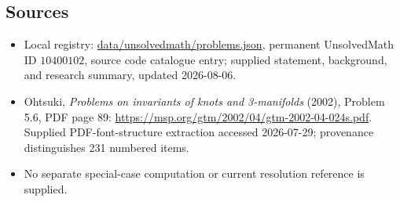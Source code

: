 \documentclass[11pt]{article}
\begin{document}
\subsection{Sources}
\begin{itemize}
\item Local registry: \url{data/unsolvedmath/problems.json}, permanent UnsolvedMath ID \(10400102\), source code catalogue entry; supplied statement, background, and research summary, updated 2026-08-06.
\item Ohtsuki, \emph{Problems on invariants of knots and 3-manifolds} (2002), Problem 5.6, PDF page 89: \url{https://msp.org/gtm/2002/04/gtm-2002-04-024s.pdf}. Supplied PDF-font-structure extraction accessed 2026-07-29; provenance distinguishes 231 numbered items.
\item No separate special-case computation or current resolution reference is supplied.
\end{itemize}
\end{document}
